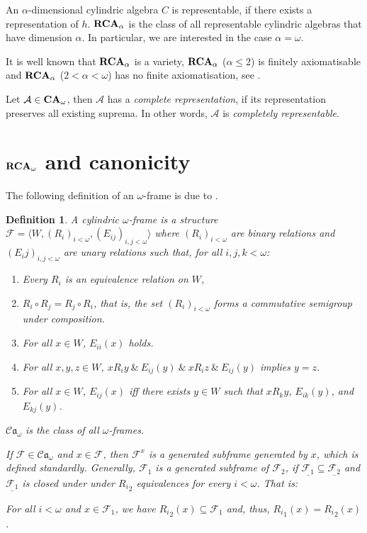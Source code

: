 \documentclass[a4paper]{article}
\theoremstyle{defin}
\newtheorem{defin}{Definition}
\theoremstyle{theorem}
\theoremstyle{prop}
\theoremstyle{lemma}
\theoremstyle{fact}
\theoremstyle{ex}
\theoremstyle{col}
\begin{document}
An $\alpha$-dimensional cylindric algebra $C$ is representable, if there exists a representation of $h$.
${\bf RCA}_{\alpha}$ is the class of all representable cylindric algebras that have dimension $\alpha$. In particular, we are interested in the case $\alpha = \omega$.

It is well known that ${\bf RCA}_{\alpha}$ is a variety, ${\bf RCA}_{\alpha}$ ($\alpha \leq 2$) is finitely axiomatisable and ${\bf RCA}_{\alpha}$ ($2 < \alpha < \omega$) has no finite axiomatisation, see \cite{Henkin1988-HENCAP-4}.

Let $\mathcal{A} \in {\bf CA}_{\omega}$, then $\mathcal{A}$ has a \emph{complete representation}, if its representation preserves all existing suprema. In other words, $\mathcal{A}$ is \emph{completely representable}.

\section{${\bf RCA}_{\omega}$ and canonicity}

The following definition of an $\omega$-frame is due to \cite{Venema2013}.
\begin{defin}
  A cylindric $\omega$-frame is a structure $\mathcal{F} = \langle W, (R_i)_{i < \omega}, (E_{ij})_{i, j < \omega} \rangle$ where $(R_i)_{i < \omega}$ are binary relations and $(E_ij)_{i, j < \omega}$ are unary relations such that, for all $i, j, k < \omega$:
  \begin{enumerate}
  \item Every $R_i$ is an equivalence relation on $W$,
  \item $R_i \circ R_j = R_j \circ R_i$, that is, the set $(R_i)_{i < \omega}$ forms a commutative semigroup under composition.
  \item For all $x \in W$, $E_{ii}(x)$ holds.
  \item For all $x, y, z \in W$, $x R_i y \: \& \: E_{ij}(y) \: \& \: x R_i z \: \& \: E_{ij}(y)$ implies $y = z$.
  \item For all $x \in W$, $E_{ij}(x)$ iff there exists $y \in W$ such that $x R_k y$, $E_{ik}(y)$, and $E_{kj}(y)$.
  \end{enumerate}
  $\mathcal{C}\mathfrak{a}_{\omega}$ is the class of all $\omega$-frames.

  If $\mathcal{F} \in \mathcal{C}\mathfrak{a}_{\omega}$ and $x \in \mathcal{F}$, then $\mathcal{F}^{x}$ is a generated subframe generated by $x$, which is defined standardly. Generally, $\mathcal{F}_1$ is a generated subframe of $\mathcal{F}_2$, if $\underline{\mathcal{F}_1} \subseteq \underline{\mathcal{F}_2}$ and $\underline{\mathcal{F}_1}$ is closed under under ${R_i}_2$ equivalences for every $i < \omega$. That is:
  \begin{center}
  For all $i < \omega$ and $x \in \mathcal{F}_1$, we have ${R_i}_2(x) \subseteq \mathcal{F}_1$ and, thus, ${R_i}_1(x) = {R_i}_2(x)$.
  \end{center}
\end{defin}
\end{document}
